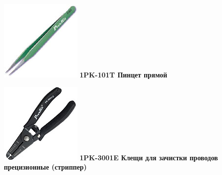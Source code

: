 {\begin{multicols}{2}
\noindent\includegraphics[width=\columnwidth]{00/fig/pros/1PK-101T.jpg}
\textbf{1PK-101T Пинцет прямой}

\noindent\includegraphics[width=\columnwidth]{00/fig/pros/1PK-3001E.jpg}
\textbf{1PK-3001E Клещи для зачистки проводов прецизионные (стриппер)}


\end{multicols}}
